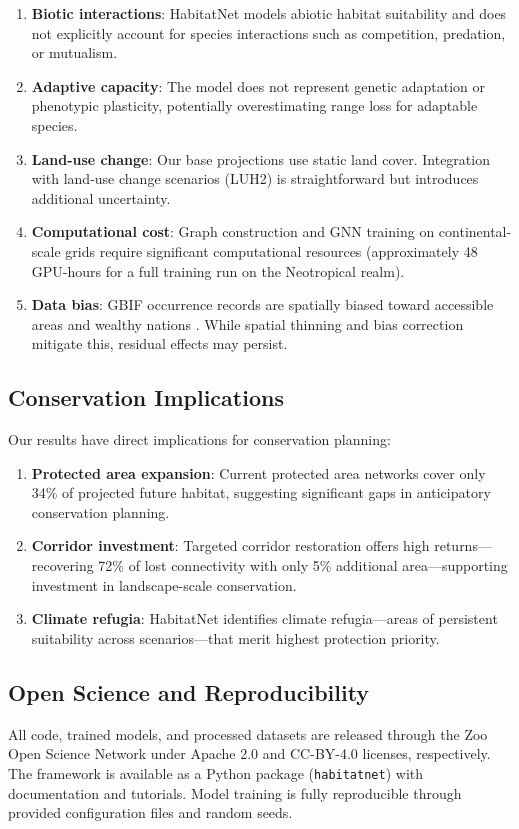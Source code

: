 \begin{enumerate}
  \item \textbf{Biotic interactions}: HabitatNet models abiotic habitat
    suitability and does not explicitly account for species interactions
    such as competition, predation, or mutualism.
  \item \textbf{Adaptive capacity}: The model does not represent genetic
    adaptation or phenotypic plasticity, potentially overestimating range
    loss for adaptable species.
  \item \textbf{Land-use change}: Our base projections use static land
    cover. Integration with land-use change scenarios (LUH2) is
    straightforward but introduces additional uncertainty.
  \item \textbf{Computational cost}: Graph construction and GNN training
    on continental-scale grids require significant computational
    resources (approximately 48 GPU-hours for a full training run on
    the Neotropical realm).
  \item \textbf{Data bias}: GBIF occurrence records are spatially biased
    toward accessible areas and wealthy nations
    \citep{beck2014spatial}. While spatial thinning and bias correction
    mitigate this, residual effects may persist.
\end{enumerate}

\subsection{Conservation Implications}

Our results have direct implications for conservation planning:

\begin{enumerate}
  \item \textbf{Protected area expansion}: Current protected area
    networks cover only 34\% of projected future habitat, suggesting
    significant gaps in anticipatory conservation planning.
  \item \textbf{Corridor investment}: Targeted corridor restoration
    offers high returns---recovering 72\% of lost connectivity with only
    5\% additional area---supporting investment in landscape-scale
    conservation.
  \item \textbf{Climate refugia}: HabitatNet identifies climate
    refugia---areas of persistent suitability across scenarios---that
    merit highest protection priority.
\end{enumerate}

\subsection{Open Science and Reproducibility}

All code, trained models, and processed datasets are released through the
Zoo Open Science Network under Apache 2.0 and CC-BY-4.0 licenses,
respectively. The framework is available as a Python package
(\texttt{habitatnet}) with documentation and tutorials. Model training is
fully reproducible through provided configuration files and random seeds.


